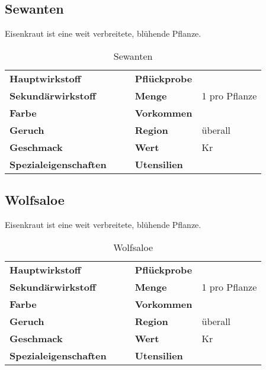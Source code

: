 \subsection{Sewanten}
Eisenkraut ist eine weit verbreitete, blühende Pflanze. 

\begin{table}[h]
\begin{center}
\begin{tabular}{|l|l|p{1cm}|l|l|}
	\cline{1-2} \cline{4-5}
	\textbf{Hauptwirkstoff} &  && \textbf{Pflückprobe} &  \\ \cline{1-2} \cline{4-5}
	\textbf{Sekundärwirkstoff} &  && \textbf{Menge} & 1 pro Pflanze \\ \cline{1-2} \cline{4-5}
	\textbf{Farbe} &  && \textbf{Vorkommen} &  \\ \cline{1-2} \cline{4-5}
	\textbf{Geruch} &  && \textbf{Region} & überall \\ \cline{1-2} \cline{4-5}
	\textbf{Geschmack} &  && \textbf{Wert} & Kr \\ \cline{1-2} \cline{4-5}
	\textbf{Spezialeigenschaften} &  && \textbf{Utensilien} &  \\ \cline{1-2} \cline{4-5}
\end{tabular}
\end{center}
\caption{Sewanten}
\label{tab:sewanten}
\end{table}


\subsection{Wolfsaloe}
Eisenkraut ist eine weit verbreitete, blühende Pflanze. 

\begin{table}[h]
\begin{center}
\begin{tabular}{|l|l|p{1cm}|l|l|}
	\cline{1-2} \cline{4-5}
	\textbf{Hauptwirkstoff} &  && \textbf{Pflückprobe} &  \\ \cline{1-2} \cline{4-5}
	\textbf{Sekundärwirkstoff} &  && \textbf{Menge} & 1 pro Pflanze \\ \cline{1-2} \cline{4-5}
	\textbf{Farbe} &  && \textbf{Vorkommen} &  \\ \cline{1-2} \cline{4-5}
	\textbf{Geruch} &  && \textbf{Region} & überall \\ \cline{1-2} \cline{4-5}
	\textbf{Geschmack} &  && \textbf{Wert} & Kr \\ \cline{1-2} \cline{4-5}
	\textbf{Spezialeigenschaften} &  && \textbf{Utensilien} &  \\ \cline{1-2} \cline{4-5}
\end{tabular}
\end{center}
\caption{Wolfsaloe}
\label{tab:wolfsaloe}
\end{table}


